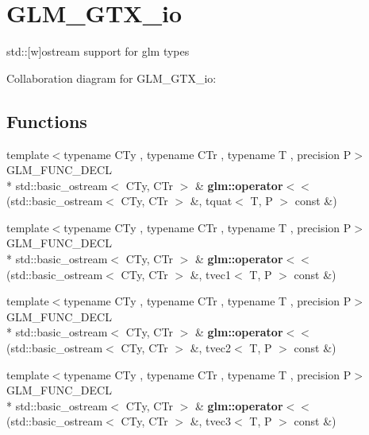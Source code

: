 \hypertarget{group__gtx__io}{\section{G\-L\-M\-\_\-\-G\-T\-X\-\_\-io}
\label{group__gtx__io}
}


std\-:\-:\mbox{[}w\mbox{]}ostream support for glm types  


Collaboration diagram for G\-L\-M\-\_\-\-G\-T\-X\-\_\-io\-:
\subsection*{Functions}
\begin{DoxyCompactItemize}
\item 
\hypertarget{group__gtx__io_ga038d37e8d7965dc7bfae5dc23e4140af}{{\footnotesize template$<$typename C\-Ty , typename C\-Tr , typename T , precision P$>$ }\\G\-L\-M\-\_\-\-F\-U\-N\-C\-\_\-\-D\-E\-C\-L \\*
std\-::basic\-\_\-ostream$<$ C\-Ty, C\-Tr $>$ \& {\bfseries glm\-::operator$<$$<$} (std\-::basic\-\_\-ostream$<$ C\-Ty, C\-Tr $>$ \&, tquat$<$ T, P $>$ const \&)}\label{group__gtx__io_ga038d37e8d7965dc7bfae5dc23e4140af}

\item 
\hypertarget{group__gtx__io_ga171289d1671b75e033a1b078c68a7460}{{\footnotesize template$<$typename C\-Ty , typename C\-Tr , typename T , precision P$>$ }\\G\-L\-M\-\_\-\-F\-U\-N\-C\-\_\-\-D\-E\-C\-L \\*
std\-::basic\-\_\-ostream$<$ C\-Ty, C\-Tr $>$ \& {\bfseries glm\-::operator$<$$<$} (std\-::basic\-\_\-ostream$<$ C\-Ty, C\-Tr $>$ \&, tvec1$<$ T, P $>$ const \&)}\label{group__gtx__io_ga171289d1671b75e033a1b078c68a7460}

\item 
\hypertarget{group__gtx__io_ga0a3bca262adbba991f394d8d3d52e10d}{{\footnotesize template$<$typename C\-Ty , typename C\-Tr , typename T , precision P$>$ }\\G\-L\-M\-\_\-\-F\-U\-N\-C\-\_\-\-D\-E\-C\-L \\*
std\-::basic\-\_\-ostream$<$ C\-Ty, C\-Tr $>$ \& {\bfseries glm\-::operator$<$$<$} (std\-::basic\-\_\-ostream$<$ C\-Ty, C\-Tr $>$ \&, tvec2$<$ T, P $>$ const \&)}\label{group__gtx__io_ga0a3bca262adbba991f394d8d3d52e10d}

\item 
\hypertarget{group__gtx__io_ga0d6cfb5d138639b90f18d7bbb2a4ae56}{{\footnotesize template$<$typename C\-Ty , typename C\-Tr , typename T , precision P$>$ }\\G\-L\-M\-\_\-\-F\-U\-N\-C\-\_\-\-D\-E\-C\-L \\*
std\-::basic\-\_\-ostream$<$ C\-Ty, C\-Tr $>$ \& {\bfseries glm\-::operator$<$$<$} (std\-::basic\-\_\-ostream$<$ C\-Ty, C\-Tr $>$ \&, tvec3$<$ T, P $>$ const \&)}\label{group__gtx__io_ga0d6cfb5d138639b90f18d7bbb2a4ae56}


\end{DoxyCompactItemize}

